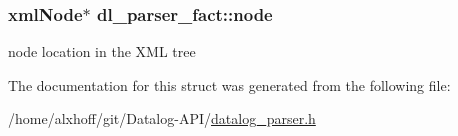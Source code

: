 \subsubsection[{\texorpdfstring{node}{node}}]{\setlength{\rightskip}{0pt plus 5cm}xml\+Node$\ast$ dl\+\_\+parser\+\_\+fact\+::node}\hypertarget{structdl__parser__fact_a1a5d064b161e07cfacedd5cdf871d04f}{}\label{structdl__parser__fact_a1a5d064b161e07cfacedd5cdf871d04f}
node location in the X\+ML tree 

The documentation for this struct was generated from the following file\+:\begin{DoxyCompactItemize}
\item 
/home/alxhoff/git/\+Datalog-\/\+A\+P\+I/\hyperlink{datalog__parser_8h}{datalog\+\_\+parser.\+h}\end{DoxyCompactItemize}

